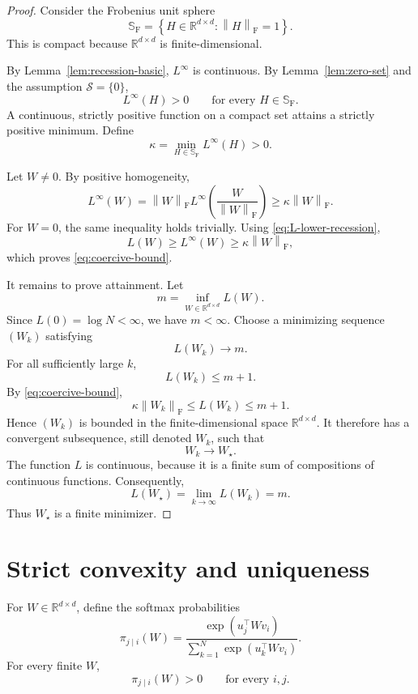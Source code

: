 \documentclass[11pt]{article}
\newcommand{\R}{\mathbb{R}}
\newcommand{\F}{\mathrm{F}}
\newcommand{\norm}[1]{\left\lVert #1\right\rVert}
\newcommand{\Sph}{\mathbb{S}}
\newcommand{\cS}{\mathcal{S}}
\newcommand{\1}{\mathbf{1}}
\begin{document}
\begin{proof}
Consider the Frobenius unit sphere
\[
\Sph_{\F}
=
\left\{
H\in\R^{d\times d}:\norm{H}_{\F}=1
\right\}.
\]
This is compact because \(\R^{d\times d}\) is finite-dimensional.

By Lemma~\ref{lem:recession-basic}, \(L^\infty\) is continuous.
By Lemma~\ref{lem:zero-set} and the assumption \(\cS=\{0\}\),
\[
L^\infty(H)>0
\qquad
\text{for every }H\in\Sph_{\F}.
\]
A continuous, strictly positive function on a compact set attains a
strictly positive minimum. Define
\[
\kappa
=
\min_{H\in\Sph_{\F}}L^\infty(H)>0.
\]

Let \(W\neq 0\). By positive homogeneity,
\[
L^\infty(W)
=
\norm{W}_{\F}
L^\infty\left(
\frac{W}{\norm{W}_{\F}}
\right)
\ge
\kappa\norm{W}_{\F}.
\]
For \(W=0\), the same inequality holds trivially. Using
\eqref{eq:L-lower-recession},
\[
L(W)
\ge
L^\infty(W)
\ge
\kappa\norm{W}_{\F},
\]
which proves \eqref{eq:coercive-bound}.

It remains to prove attainment. Let
\[
m=\inf_{W\in\R^{d\times d}}L(W).
\]
Since \(L(0)=\log N<\infty\), we have \(m<\infty\).
Choose a minimizing sequence \((W_k)\) satisfying
\[
L(W_k)\longrightarrow m.
\]
For all sufficiently large \(k\),
\[
L(W_k)\le m+1.
\]
By \eqref{eq:coercive-bound},
\[
\kappa\norm{W_k}_{\F}
\le
L(W_k)
\le
m+1.
\]
Hence \((W_k)\) is bounded in the finite-dimensional space
\(\R^{d\times d}\). It therefore has a convergent subsequence,
still denoted \(W_k\), such that
\[
W_k\longrightarrow W_\star.
\]
The function \(L\) is continuous, because it is a finite sum of
compositions of continuous functions. Consequently,
\[
L(W_\star)
=
\lim_{k\to\infty}L(W_k)
=
m.
\]
Thus \(W_\star\) is a finite minimizer.
\end{proof}

\section{Strict convexity and uniqueness}

For \(W\in\R^{d\times d}\), define the softmax probabilities
\begin{equation}
\pi_{j\mid i}(W)
=
\frac{
\exp(u_j^\top Wv_i)
}{
\sum_{k=1}^{N}\exp(u_k^\top Wv_i)
}.
\label{eq:softmax}
\end{equation}
For every finite \(W\),
\[
\pi_{j\mid i}(W)>0
\qquad
\text{for every }i,j.
\]
\end{document}
